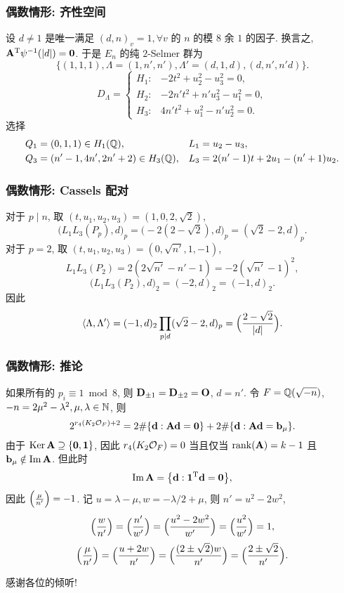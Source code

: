 \documentclass{beamer}
\begin{document}
\begin{frame}
\frametitle{偶数情形: 齐性空间}
设 $d\neq 1$ 是唯一满足 $(d,n)_v=1,\forall v$ 的 $n$ 的模 $8$ 余 $1$ 的因子. 换言之, ${\mathbf{A}}^{\mathrm{T}}\psi^{-1}(|d|)={\bf0}$. 于是 $E_n$ 的纯 $2$-Selmer 群为
\[\{(1,1,1), \Lambda=(1,n',n'), \Lambda'=(d,1,d), (d,n',n'd)\}.\]
\[D_\Lambda=\begin{cases}
H_1:& -2t^2+u_2^2-u_3^2=0,\\
H_2:& -2n't^2+n'u_3^2-u_1^2=0,\\
H_3:& 4n't^2+u_1^2-n'u_2^2=0.
\end{cases}\] 
选择
\begin{align*}
Q_1&=(0,1,1)\in H_1({\mathbb{Q}}),& L_1&=u_2-u_3,\\
Q_3&=(n'-1,4n',2n'+2)\in H_3({\mathbb{Q}}),& L_3&=2(n'-1)t+2u_1-(n'+1)u_2.
\end{align*}
\end{frame}

\begin{frame}
\frametitle{偶数情形: Cassels 配对}
对于 $p\mid n$, 取 $(t,u_1,u_2,u_3)=(1,0,2,\sqrt{2})$, 
\[\bigl(L_1L_3(P_p),d\bigr)_p=\bigl(-2(2-\sqrt{2}),d\bigr)_p=(\sqrt{2}-2,d)_p.\] 
对于 $p=2$, 取 $(t,u_1,u_2,u_3)=(0,\sqrt{n'},1,-1)$,
\[L_1L_3(P_2)=2(2\sqrt{n'}-n'-1)=-2(\sqrt{n'}-1)^2,\]
\[\bigl(L_1L_3(P_2),d\bigr)_2=(-2,d)_2=(-1,d)_2.\]
因此
\[\langle{\Lambda,\Lambda'}\rangle=(-1,d)_2\prod_{p\mid d}(\sqrt{2}-2,d)_p=\Bigl(\frac{{2-\sqrt{2}}}{|d|}\Bigr).\]
\end{frame}

\begin{frame}
\frametitle{偶数情形: 推论}
如果所有的 $p_i\equiv1\bmod8$, 则 ${\mathbf{D}}_{\pm1}={\mathbf{D}}_{\pm2}={\mathbf{O}}$, $d=n'$. 令 $F={\mathbb{Q}}(\sqrt{-n})$, $-n=2\mu^2-\lambda^2,\mu,\lambda\in{\mathbb{N}}$, 则
\[2^{r_4(K_2{\mathcal{O}}_F)+2}=2\#{\left\{{\mathbf{d}}: {\mathbf{A}}{\mathbf{d}}={\bf0}\right\}}+2\#{\left\{{\mathbf{d}}:{\mathbf{A}}{\mathbf{d}}={\mathbf{b}}_\mu\right\}}.\]
由于 $\operatorname{Ker} {\mathbf{A}}\supseteq{\left\{{\bf0},{\bf1}\right\}}$, 因此 $r_4(K_2{\mathcal{O}}_F)=0$ 当且仅当 $\operatorname{rank} ({\mathbf{A}})=k-1$ 且 ${\mathbf{b}}_\mu\notin\operatorname{Im}{\mathbf{A}}$.  
但此时
\[\operatorname{Im}{\mathbf{A}}={\left\{{\mathbf{d}}:{\bf1}^{\mathrm{T}}{\mathbf{d}}={\bf0}\right\}},\]
因此 $\Bigl(\frac{{\mu}}{n'}\Bigr)=-1$.
记 $u=\lambda-\mu, w=-\lambda/2+\mu$, 则 $n'=u^2-2w^2$,
\[\Bigl(\frac{{w}}{n'}\Bigr)=\Bigl(\frac{{n'}}{w'}\Bigr)=\Bigl(\frac{{u^2-2w^2}}{w'}\Bigr)=\Bigl(\frac{{u^2}}{w'}\Bigr)=1,\]
\[\Bigl(\frac{{\mu}}{n'}\Bigr)=\Bigl(\frac{{u+2w}}{n'}\Bigr)=\Bigl(\frac{{(2\pm\sqrt{2})w}}{n'}\Bigr)=\Bigl(\frac{{2\pm\sqrt{2}}}{n'}\Bigr).\]
\end{frame}

\begin{frame}
\begin{center}
\huge 感谢各位的倾听!
\end{center}
\end{frame}
\end{document}
